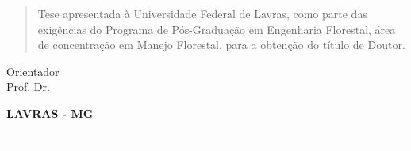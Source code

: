 \newpage
\vspace{-0.7cm}
\centerline{\textbf{\teseauthorcap}}
\vspace{1.4cm}
\begin{singlespace}
\begin{center}
\textbf{\tesetitlecap}
\end{center}
\end{singlespace}
\vspace{1cm}
\begin{flushright}
\begin{minipage}{9.6cm}
\begin{quote}
\begin{singlespace}
Tese apresentada à Universidade Federal de Lavras, como parte das exigências do Programa de Pós-Graduação em Engenharia Florestal, área de concentração em Manejo Florestal, para a obtenção do título de Doutor.
\end{singlespace}
\end{quote}
\end{minipage}
\end{flushright}
\vspace{1.1cm}

\begin{center}
\begin{singlespace}
\noindent Orientador\\
\noindent Prof. Dr. \teseorientador

\vfill

\Large{\textbf{LAVRAS - MG\\ \teseyear}}
\end{singlespace}
\end{center}


\newpage
\textcolor{white}{fantasma}

